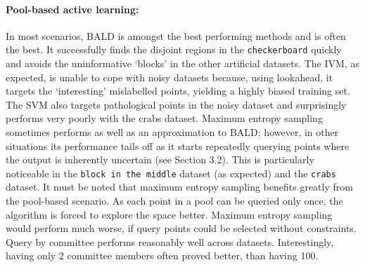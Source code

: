 \documentclass[twoside]{article}
\begin{document}
\paragraph{Pool-based active learning:} In most scenarios, BALD is amongst the best performing methods and is often the best. It successfully finds the disjoint regions in the \texttt{checkerboard} quickly and avoids the uninformative `blocks' in the other artificial datasets. The IVM, as expected, is unable to cope with noisy datasets because, using lookahead, it targets the `interesting' mislabelled points, yielding a highly biased training set. The SVM also targets pathological points in the noisy dataset and surprisingly performs very poorly with the crabs dataset. Maximum entropy sampling sometimes performs as well as an approximation to BALD; however, in other situations its performance tails off as it starts repeatedly querying points where the output is inherently uncertain (see Section 3.2). This is particularly noticeable in the \texttt{block in the middle} dataset (as expected) and the \texttt{crabs} dataset. It must be noted that maximum entropy sampling benefits greatly from the pool-based scenario. As each point in a pool can be queried only once, the algorithm is forced to explore the space better. Maximum entropy sampling would perform much worse, if query points could be selected without constraints. Query by committee performs reasonably well across datasets. Interestingly, having only 2 committee members often proved better, than having 100.
\end{document}
